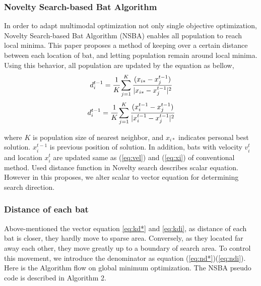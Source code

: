 
\subsubsection{Novelty Search-based Bat Algorithm}
In order to adapt multimodal optimization not only single objective optimization, Novelty Search-based Bat Algorithm (NSBA) enables all population to reach local minima. This paper proposes a method of keeping over a certain distance between each location of bat, and letting population remain around local minima. Using this behavior, all population are updated by the equation as bellow, 
\begin{equation}
d_i^{t-1}=\cfrac{1}{K}\sum_{j=1}^K \cfrac{(x_{i*}-x_j^{t-1})}{|x_{i*}-x_j^{t-1}|^2}
\label{eq:nd*}
\end{equation}
\begin{equation}
d_i^{t-1}=\cfrac{1}{K}\sum_{j=1}^K \cfrac{(x_i^{t-1}-x_j^{t-1})}{|x_i^{t-1}-x_j^{t-1}|^2}
\label{eq:ndi}
\end{equation}

where ${K}$ is population size of nearest neighbor, and ${x_{i*}}$ indicates personal best solution. ${x_i^{t-1}}$ is previous position of solution. In addition, bats with velocity ${v_i^t}$ and location ${x_i^t}$ are updated same as (\ref{eq:vel}) and (\ref{eq:xi}) of conventional method. Used distance function in Novelty search describes scalar equation. However in this proposes, we alter scalar to vector equation for determining search direction. 

 \subsubsection{Distance of each bat} 
 Above-mentioned the vector equation \ref{eq:kd*} and \ref{eq:kdi}, as distance of each bat is closer, they hardly move to sparse area. Conversely, as they located far away each other, they move greatly up to a boundary of search area. To control this movement, we introduce the denominator as equation (\ref{eq:nd*})(\ref{eq:ndi}). Here is the Algorithm flow on global minimum optimization. The NSBA pseudo code is described in Algorithm 2.

